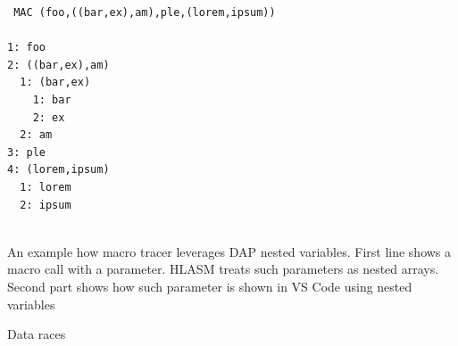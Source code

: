 \begin{listing}
	
	\begin{verbatim}
 MAC (foo,((bar,ex),am),ple,(lorem,ipsum))

1: foo
2: ((bar,ex),am)
  1: (bar,ex)
    1: bar
    2: ex
  2: am
3: ple
4: (lorem,ipsum)
  1: lorem
  2: ipsum
    
	\end{verbatim}
	\caption{An example how macro tracer leverages DAP nested variables. First line shows a macro call with a parameter. HLASM treats such parameters as nested arrays. Second part shows how such parameter is shown in VS Code using nested variables}
	\label{dap_nested_variables}
\end{listing}



Data races

